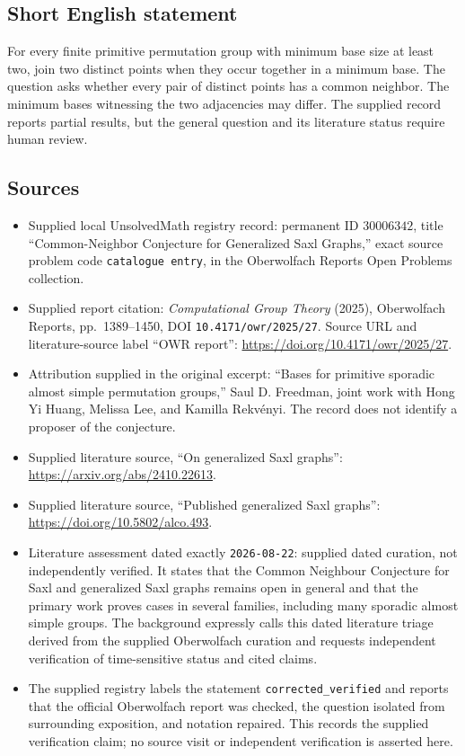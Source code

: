 \documentclass[11pt]{article}
\begin{document}
\subsection{Short English statement}
For every finite primitive permutation group with minimum base size at least two, join two distinct points when they occur together in a minimum base. The question asks whether every pair of distinct points has a common neighbor. The minimum bases witnessing the two adjacencies may differ. The supplied record reports partial results, but the general question and its literature status require human review.
\subsection{Sources}
\begin{itemize}
\item Supplied local UnsolvedMath registry record: permanent ID \(30006342\), title ``Common-Neighbor Conjecture for Generalized Saxl Graphs,'' exact source problem code \texttt{catalogue entry}, in the Oberwolfach Reports Open Problems collection.
\item Supplied report citation: \emph{Computational Group Theory} (2025), Oberwolfach Reports, pp.~1389--1450, DOI \texttt{10.4171/owr/2025/27}. Source URL and literature-source label ``OWR report'': \url{https://doi.org/10.4171/owr/2025/27}.
\item Attribution supplied in the original excerpt: ``Bases for primitive sporadic almost simple permutation groups,'' Saul D. Freedman, joint work with Hong Yi Huang, Melissa Lee, and Kamilla Rekv\'enyi. The record does not identify a proposer of the conjecture.
\item Supplied literature source, ``On generalized Saxl graphs'': \url{https://arxiv.org/abs/2410.22613}.
\item Supplied literature source, ``Published generalized Saxl graphs'': \url{https://doi.org/10.5802/alco.493}.
\item Literature assessment dated exactly \texttt{2026-08-22}: supplied dated curation, not independently verified. It states that the Common Neighbour Conjecture for Saxl and generalized Saxl graphs remains open in general and that the primary work proves cases in several families, including many sporadic almost simple groups. The background expressly calls this dated literature triage derived from the supplied Oberwolfach curation and requests independent verification of time-sensitive status and cited claims.
\item The supplied registry labels the statement \texttt{corrected\_verified} and reports that the official Oberwolfach report was checked, the question isolated from surrounding exposition, and notation repaired. This records the supplied verification claim; no source visit or independent verification is asserted here.
\end{itemize}
\end{document}
